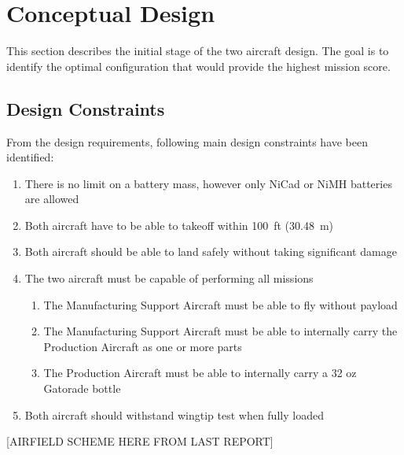 \section{Conceptual Design}

This section describes the initial stage of the two aircraft design. The goal is to identify the optimal configuration that would provide the highest mission score.



\subsection{Design Constraints}

From the design requirements, following main design constraints have been identified:

\begin{enumerate}
    \item There is no limit on a battery mass, however only NiCad or NiMH batteries are allowed
    \item Both aircraft have to be able to takeoff within \SI{100}{ft} (\SI{30.48}{m})
    \item Both aircraft should be able to land safely without taking significant damage
    \item The two aircraft must be capable of performing all missions
    \begin{enumerate}
        \item The Manufacturing Support Aircraft must be able to fly without payload
        \item The Manufacturing Support Aircraft must be able to internally carry the Production Aircraft as one or more parts
        \item The Production Aircraft must be able to internally carry a 32 oz Gatorade bottle
        
    \end{enumerate}
    \item Both aircraft should withstand wingtip test when fully loaded
    \
\end{enumerate}


[AIRFIELD SCHEME HERE FROM LAST REPORT]







